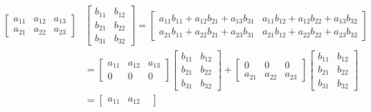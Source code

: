 \documentclass[../main.tex]{subfiles}
\begin{document}
\begin{align*}
\begin{bmatrix}
    \scriptstyle a_{11} &
    \scriptstyle a_{12} &
    \scriptstyle a_{13} \\
    \scriptstyle a_{21} &
    \scriptstyle a_{22} &
    \scriptstyle a_{23}
\end{bmatrix}
&\begin{bmatrix}
    \scriptstyle b_{11} &
    \scriptstyle b_{12} \\
    \scriptstyle b_{21} &
    \scriptstyle b_{22} \\
    \scriptstyle b_{31} &
    \scriptstyle b_{32}
\end{bmatrix}
=
\begin{bmatrix}
    \scriptstyle a_{11} b_{11} + a_{12} b_{21} + a_{13} b_{31} &
    \scriptstyle a_{11} b_{12} + a_{12} b_{22} + a_{13} b_{32} \\
    \scriptstyle a_{21} b_{11} + a_{22} b_{21} + a_{23} b_{31} &
    \scriptstyle a_{21} b_{12} + a_{22} b_{22} + a_{23} b_{32}
\end{bmatrix} \\
&=
\begin{bmatrix}
    \scriptstyle a_{11} &
    \scriptstyle a_{12} &
    \scriptstyle a_{13} \\
    \scriptstyle 0      &
    \scriptstyle 0      &
    \scriptstyle 0
\end{bmatrix}
\begin{bmatrix}
    \scriptstyle b_{11} &
    \scriptstyle b_{12} \\
    \scriptstyle b_{21} &
    \scriptstyle b_{22} \\
    \scriptstyle b_{31} &
    \scriptstyle b_{32}
\end{bmatrix}
+
\begin{bmatrix}
    \scriptstyle 0      &
    \scriptstyle 0      &
    \scriptstyle 0 \\
    \scriptstyle a_{21} &
    \scriptstyle a_{22} &
    \scriptstyle a_{23}
\end{bmatrix}
\begin{bmatrix}
    \scriptstyle b_{11} & \scriptstyle b_{12} \\
    \scriptstyle b_{21} & \scriptstyle b_{22} \\
    \scriptstyle b_{31} & \scriptstyle b_{32}
\end{bmatrix} \\
&=
\begin{bmatrix}
    \scriptstyle a_{11} &
    \scriptstyle a_{12} &

\end{bmatrix}
\end{align*}
\end{document}
